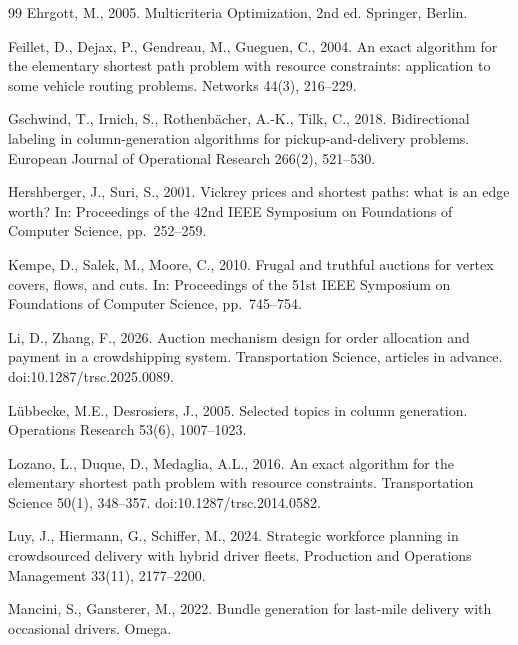 \documentclass[review,12pt]{elsarticle}
\theoremstyle{definition}
\theoremstyle{remark}
\begin{document}
\begin{thebibliography}{99}
Ehrgott, M., 2005. Multicriteria Optimization, 2nd ed. Springer, Berlin.

Feillet, D., Dejax, P., Gendreau, M., Gueguen, C., 2004. An exact algorithm
for the elementary shortest path problem with resource constraints:
application to some vehicle routing problems. Networks 44(3), 216--229.

Gschwind, T., Irnich, S., Rothenb{\"a}cher, A.-K., Tilk, C., 2018.
Bidirectional labeling in column-generation algorithms for
pickup-and-delivery problems. European Journal of Operational Research
266(2), 521--530.

Hershberger, J., Suri, S., 2001. Vickrey prices and shortest paths: what is
an edge worth? In: Proceedings of the 42nd IEEE Symposium on Foundations of
Computer Science, pp.~252--259.

Kempe, D., Salek, M., Moore, C., 2010. Frugal and truthful auctions for
vertex covers, flows, and cuts. In: Proceedings of the 51st IEEE Symposium
on Foundations of Computer Science, pp.~745--754. %

Li, D., Zhang, F., 2026. Auction mechanism design for order allocation and
payment in a crowdshipping system. Transportation Science, articles in
advance. doi:10.1287/trsc.2025.0089.

L{\"u}bbecke, M.E., Desrosiers, J., 2005. Selected topics in column
generation. Operations Research 53(6), 1007--1023.

Lozano, L., Duque, D., Medaglia, A.L., 2016. An exact algorithm for the
elementary shortest path problem with resource constraints. Transportation
Science 50(1), 348--357. doi:10.1287/trsc.2014.0582. %

Luy, J., Hiermann, G., Schiffer, M., 2024. Strategic workforce planning in
crowdsourced delivery with hybrid driver fleets. Production and Operations
Management 33(11), 2177--2200.

Mancini, S., Gansterer, M., 2022. Bundle generation for last-mile delivery
with occasional drivers. Omega. %


\end{thebibliography}
\end{document}

